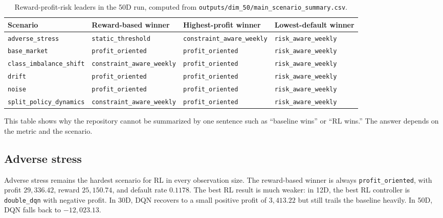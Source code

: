 \documentclass[12pt,a4paper]{article}
\begin{document}
\begin{table}[H]
    \centering
    \footnotesize
    \setlength{\tabcolsep}{4pt}
    \begin{tabularx}{\textwidth}{>{\raggedright\arraybackslash}X
            >{\raggedright\arraybackslash}X
            >{\raggedright\arraybackslash}X
            >{\raggedright\arraybackslash}X}
        \toprule
        Scenario                         & Reward-based winner                & Highest-profit winner              & Lowest-default winner        \\
        \midrule
        \texttt{adverse\_stress}         & \texttt{static\_threshold}         & \texttt{constraint\_aware\_weekly} & \texttt{risk\_aware\_weekly} \\
        \texttt{base\_market}            & \texttt{profit\_oriented}          & \texttt{profit\_oriented}          & \texttt{risk\_aware\_weekly} \\
        \texttt{class\_imbalance\_shift} & \texttt{constraint\_aware\_weekly} & \texttt{profit\_oriented}          & \texttt{risk\_aware\_weekly} \\
        \texttt{drift}                   & \texttt{profit\_oriented}          & \texttt{profit\_oriented}          & \texttt{risk\_aware\_weekly} \\
        \texttt{noise}                   & \texttt{profit\_oriented}          & \texttt{profit\_oriented}          & \texttt{risk\_aware\_weekly} \\
        \texttt{split\_policy\_dynamics} & \texttt{constraint\_aware\_weekly} & \texttt{profit\_oriented}          & \texttt{risk\_aware\_weekly} \\
        \bottomrule
    \end{tabularx}
    \caption{Reward-profit-risk leaders in the 50D run, computed from \texttt{outputs/dim\_50/main\_scenario\_summary.csv}.}
    \label{tab:en-scenario-tradeoff-50}
\end{table}

This table shows why the repository cannot be summarized by one sentence such as ``baseline wins'' or ``RL wins.'' The answer depends on the metric and the scenario.

\subsection{Adverse stress}

Adverse stress remains the hardest scenario for RL in every observation size. The reward-based winner is always \texttt{profit\_oriented}, with profit $29{,}336.42$, reward $25{,}150.74$, and default rate $0.1178$. The best RL result is much weaker: in 12D, the best RL controller is \texttt{double\_dqn} with negative profit. In 30D, DQN recovers to a small positive profit of $3{,}413.22$ but still trails the baseline heavily. In 50D, DQN falls back to $-12{,}023.13$.
\end{document}
